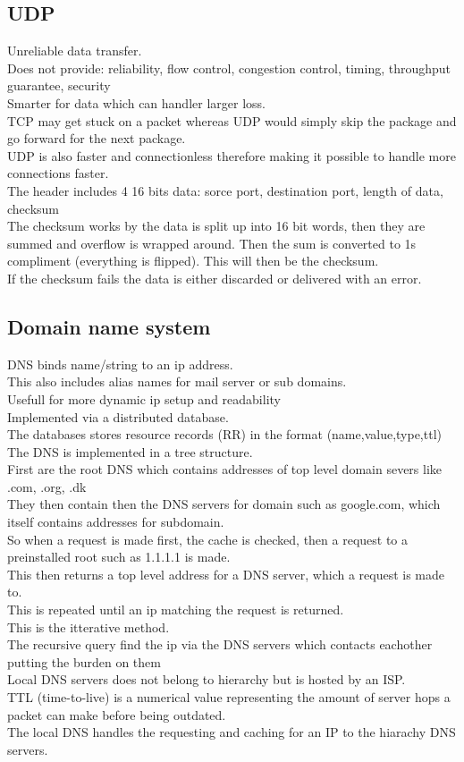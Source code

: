 \documentclass[12pt, a4paper]{article}
\begin{document}
		\subsection{UDP}
			Unreliable data transfer.\\
			Does not provide: reliability, flow control, congestion control, timing, throughput guarantee, security\\
			Smarter for data which can handler larger loss. \\
			TCP may get stuck on a packet whereas UDP would simply skip the package and go forward for the next package.\\
			UDP is also faster and connectionless therefore making it possible to handle more connections faster.\\
			The header includes 4 16 bits data: sorce port, destination port, length of data, checksum\\
			The checksum works by the data is split up into 16 bit words, then they are summed and overflow is wrapped around. Then the sum is converted to 1s compliment (everything is flipped). This will then be the checksum.\\
			If the checksum fails the data is either discarded or delivered with an error.
		\subsection{Domain name system}
			DNS binds name/string to an ip address.\\
			This also includes alias names for mail server or sub domains.\\
			Usefull for more dynamic ip setup and readability\\
			Implemented via a distributed database.\\
			The databases stores resource records (RR) in the format (name,value,type,ttl)\\
			The DNS is implemented in a tree structure.\\
			First are the root DNS which contains addresses of top level domain severs like .com, .org, .dk\\
			They then contain then the DNS servers for domain such as google.com, which itself contains addresses for subdomain.\\
			So when a request is made first, the cache is checked, then a request to a preinstalled root such as 1.1.1.1 is made.\\
			This then returns a top level address for a DNS server, which a request is made to. \\
			This is repeated until an ip matching the request is returned.\\
			This is the itterative method.\\
			The recursive query find the ip via the DNS servers which contacts eachother putting the burden on them\\
			Local DNS servers does not belong to hierarchy but is hosted by an ISP.\\
			TTL (time-to-live) is a numerical value representing the amount of server hops a packet can make before being outdated.\\	
			The local DNS handles the requesting and caching for an IP to the hiarachy DNS servers.
\end{document}
